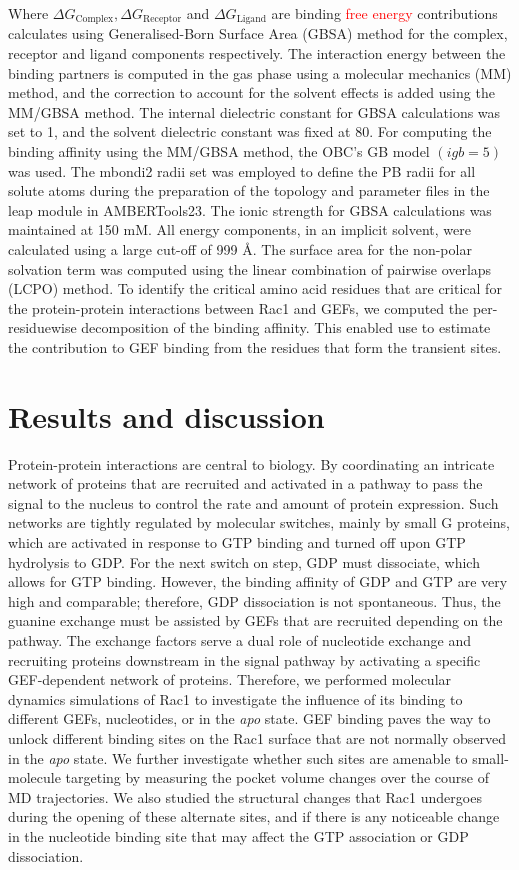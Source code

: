 \documentclass[12pt,a4paper]{achemso}
\begin{document}
Where  ${\Delta}G_{\text{Complex}}, {\Delta}G_{\text{Receptor}}$ and $ {\Delta}G_{\text{Ligand}}$ are binding \textcolor{red}{free energy} contributions calculates using Generalised-Born Surface Area (GBSA) method for the complex, receptor and ligand components respectively. The interaction energy between the binding partners is computed in the gas phase using a molecular mechanics (MM) method, and the correction to account for the solvent effects is added using the MM/GBSA method. The internal dielectric constant for GBSA calculations was set to 1, and the solvent dielectric constant was fixed at 80. For computing the binding affinity using the MM/GBSA method, the OBC’s GB model\cite{igb5} $ (igb = 5) $ was used. The mbondi2 radii set was employed to define the PB radii for all solute atoms during the preparation of the topology and parameter files in the leap module in AMBERTools23. The ionic strength for GBSA calculations was maintained at 150 mM. All energy components, in an implicit solvent, were calculated using a large cut-off of 999 \r{A}. The surface area for the non-polar solvation term was computed using the linear combination of pairwise overlaps (LCPO) method\cite{lcpo}. To identify the critical amino acid residues that are critical for the protein-protein interactions between Rac1 and GEFs, we computed the per-residuewise decomposition of the binding affinity. This enabled use to estimate the contribution to GEF binding from the residues that form the transient sites.

\section{Results and discussion}
Protein-protein interactions are central to biology. By coordinating an intricate network of proteins that are recruited and activated in a pathway to pass the signal to the nucleus to control the rate and amount of protein expression. Such networks are tightly regulated by molecular switches, mainly by small G proteins, which are activated in response to GTP binding and turned off upon GTP hydrolysis to GDP. For the next switch on step, GDP must dissociate, which allows for GTP binding. However, the binding affinity of GDP and GTP are very high and comparable; therefore, GDP dissociation is not spontaneous. Thus, the guanine exchange must be assisted by GEFs that are recruited depending on the pathway. The exchange factors serve a dual role of nucleotide exchange and recruiting proteins downstream in the signal pathway by activating a specific GEF-dependent network of proteins. Therefore, we performed molecular dynamics simulations of Rac1 to investigate the influence of its binding to different GEFs, nucleotides, or in the \textit{apo} state. GEF binding paves the way to unlock different binding sites on the Rac1 surface that are not normally observed in the \textit{apo} state. We further investigate whether such sites are amenable to small-molecule targeting by measuring the pocket volume changes over the course of MD trajectories. We also studied the structural changes that Rac1 undergoes during the opening of these alternate sites, and if there is any noticeable change in the nucleotide binding site that may affect the GTP association or GDP dissociation. 
\end{document}
